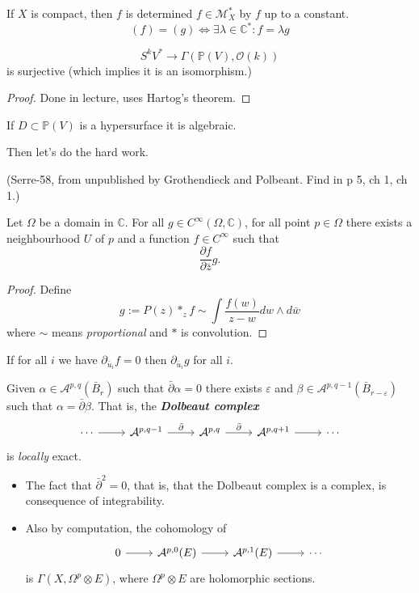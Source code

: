 \documentclass{article}
\newcommand{\C}{\mathbb{C}}
\renewcommand{\P}{\mathbb{P}}
\newcommand{\Ac}{\mathcal{A}}
\newcommand{\Mc}{\mathcal{M}}
\newcommand{\Oc}{\mathcal{O}}
\newcommand{\Cinf}{C^\infty}
\begin{document}
If $X$ is compact, then $f$ is determined $f\in\Mc_X^*$ by $f$ up to a constant.
\[(f)=(g)\iff\exists\lambda\in\C^*:f=\lambda g\]
\begin{claim}
	\[S^kV^*\to\Gamma(\P(V),\Oc(k))\]
	is surjective (which implies it is an isomorphism.)
\end{claim}
\begin{proof}
	Done in lecture, uses Hartog's theorem.
\end{proof}
\begin{remark}
	If $D\subset\P(V)$ is a hypersurface it is algebraic.
\end{remark}
Then let's do the hard work.
\begin{lemma}
	(Serre-58, from unpublished by Grothendieck and Polbeant. Find in \cite{griffiths} p 5, \cite{voisin-intro} ch 1, \cite{huybrechts} ch 1.)
	
	Let $\Omega$ be a domain in $\C$. For all $g\in\Cinf(\Omega,\C)$, for all point $p\in\Omega$ there exists a neighbourhood $U$ of $p$ and a function $f\in\Cinf$ such that
	\[\frac{\partial f}{\partial\bar{z}}g.\]
\end{lemma}
\begin{proof}
	Define \[g:=P(z)*_zf\sim\int \frac{f(w)}{z-w}dw\wedge d\bar w\]
	where $\sim$ means \textit{proportional} and $*$ is convolution.
\end{proof}
\begin{remark}
	If for all $i$ we have $\partial_{\bar u_i}f=0$ then $\partial_{\bar u_i}g$ for all $i$.
\end{remark}

\begin{lemma}
	Given $\alpha\in\Ac^{p,q}(\bar B_r)$ such that $\bar\partial \alpha=0$ there exists $\varepsilon$ and  $\beta\in\Ac^{p,q-1}(\bar B_{r-\varepsilon})$ such that $\alpha=\bar\partial\beta$. That is, the \textbf{\textit{Dolbeaut complex}}
	\[\begin{tikzcd}
		\cdots\arrow[r]&\Ac^{p,q-1}\arrow[r,"\bar\partial"]&\Ac^{p,q}\arrow[r,"\bar\partial"]&\Ac^{p,q+1}\arrow[r]&\cdots
	\end{tikzcd}\]
	is \textit{locally} exact.
\end{lemma}
\begin{remark}\leavevmode
	\begin{itemize}
		\item The fact that $\bar\partial^2=0$, that is, that the Dolbeaut complex is a complex, is consequence of integrability.
		\item Also by computation, the cohomology of
		\[\begin{tikzcd}
			0\arrow[r]&\Ac^{p,0}(E)\arrow[r]&\Ac^{p,1}(E)\arrow[r]&\cdots
		\end{tikzcd}\]
		is $\Gamma(X,\Omega^p\otimes E)$, where $\Omega^p\otimes E$ are holomorphic sections.
	\end{itemize}
\end{remark}
\end{document}
